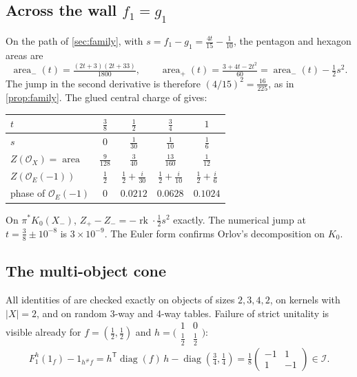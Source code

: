 \documentclass[11pt]{article}
\theoremstyle{definition}
\theoremstyle{remark}
\begin{document}
\subsection{Across the wall $f_1=g_1$}\label{sec:openwall}
On the path of \cref{sec:family}, with $s=f_1-g_1=\frac{4t}{15}-\frac1{10}$, the pentagon and hexagon areas are
\[
\operatorname{area}_-(t)=\tfrac{(2t+3)(2t+33)}{1800},\qquad \operatorname{area}_+(t)=\tfrac{3+4t-2t^2}{60}=\operatorname{area}_-(t)-\tfrac12s^2.
\]
The jump in the second derivative is therefore $(4/15)^2=\frac{16}{225}$, as in \cref{prop:family}. The glued central charge
of \cite[Def.~10.7]{Conditionals} gives:
\begin{center}\small
\begin{tabular}{@{}lcccc@{}}
\toprule
$t$ & $\tfrac38$ & $\tfrac12$ & $\tfrac34$ & $1$\\
\midrule
$s$ & $0$ & $\tfrac1{30}$ & $\tfrac1{10}$ & $\tfrac16$\\
$Z(\mathcal O_X)=\operatorname{area}$ & $\tfrac9{128}$ & $\tfrac3{40}$ & $\tfrac{13}{160}$ & $\tfrac1{12}$\\
$Z(\mathcal O_E(-1))$ & $\tfrac12$ & $\tfrac12+\tfrac i{30}$ & $\tfrac12+\tfrac i{10}$ & $\tfrac12+\tfrac i6$\\
phase of $\mathcal O_E(-1)$ & $0$ & $0.0212$ & $0.0628$ & $0.1024$\\
\bottomrule
\end{tabular}
\end{center}
On $\pi^*K_0(X_-)$, $Z_+-Z_-=-\operatorname{rk}\cdot\frac12s^2$ exactly. The numerical jump at $t=\frac38\pm10^{-8}$ is
$3\times10^{-9}$. The Euler form confirms Orlov's decomposition on $K_0$.

\subsection{The multi-object cone}\label{sec:opencone}
All identities of \cite[Thm.~10.2, Prop.~10.4]{Conditionals} are checked exactly on objects of sizes $2,3,4,2$, on kernels
with $\lvert X\rvert=2$, and on random 3-way and 4-way tables. Failure of strict unitality is visible already for $f=(\frac12,\frac12)$
and $h=\bigl(\begin{smallmatrix}1&0\\ \frac12&\frac12\end{smallmatrix}\bigr)$:
\[
F_1^h(1_f)-1_{h^\#f}=h^{\mathsf T}\operatorname{diag}(f)\,h-\operatorname{diag}(\tfrac34,\tfrac14)
=\tfrac18\begin{pmatrix}-1&1\\1&-1\end{pmatrix}\in\mathcal I.
\]
\end{document}
